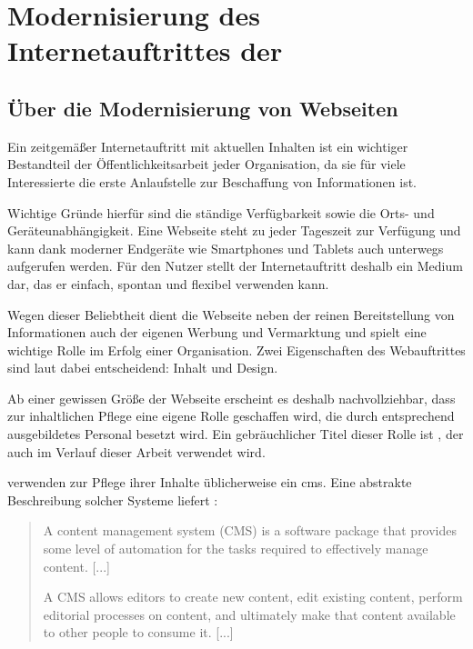 \chapter{Modernisierung des Internetauftrittes der \fernUni}
    \label{chapter:FernUniRelaunch}
    \section{Über die Modernisierung von Webseiten}
        Ein zeitgemäßer Internetauftritt mit aktuellen Inhalten
        ist ein wichtiger Bestandteil der Öffentlichkeitsarbeit jeder Organisation,
        da sie für viele Interessierte die erste Anlaufstelle zur Beschaffung von Informationen ist.
        
        Wichtige Gründe hierfür sind die ständige Verfügbarkeit sowie die Orts-
        und Geräteunabhängigkeit.
        Eine Webseite steht zu jeder Tageszeit zur Verfügung und kann
        dank moderner Endgeräte wie Smartphones und Tablets
        auch unterwegs aufgerufen werden.
        Für den Nutzer stellt der Internetauftritt deshalb ein Medium dar,
        das er einfach, spontan und flexibel verwenden kann.

        Wegen dieser Beliebtheit dient die Webseite neben der reinen Bereitstellung von Informationen
        auch der eigenen Werbung und Vermarktung und spielt eine wichtige Rolle im Erfolg einer Organisation.
        Zwei Eigenschaften des Webauftrittes sind laut \cite{sillence:onlineHealthSites} dabei
        entscheidend: Inhalt und Design.

        Ab einer gewissen Größe der Webseite erscheint es deshalb nachvollziehbar,
        dass zur inhaltlichen Pflege eine eigene Rolle geschaffen wird,
        die durch entsprechend ausgebildetes Personal besetzt wird.
        Ein gebräuchlicher Titel dieser Rolle ist \textit{\editor},
        der auch im Verlauf dieser Arbeit verwendet wird.

        \editors verwenden zur Pflege ihrer Inhalte üblicherweise ein \gls{cms}.
        Eine abstrakte Beschreibung solcher Systeme liefert \cite[][Seite 5,6]{barker:webCMS}:

        \begin{quote}
            A content management system (CMS) is a software package that provides
            some level of automation for the tasks required to effectively manage content.
            [...]

            A CMS allows editors to create new content, edit existing content,
            perform editorial processes on content, and ultimately make that content
            available to other people to consume it.
            [...]
        \end{quote}

